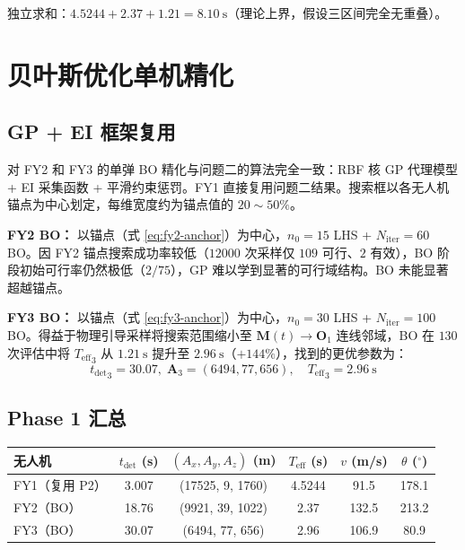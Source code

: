 \documentclass[12pt,a4paper]{ctexart}
\newcommand{\tdet}{t_{\text{det}}}
\newcommand{\Teff}{T_{\text{eff}}}
\begin{document}
独立求和：$4.5244 + 2.37 + 1.21 = 8.10\ \mathrm{s}$（理论上界，假设三区间完全无重叠）。

\section{贝叶斯优化单机精化}
\label{sec:p4-bo}

\subsection{GP + EI 框架复用}

对 FY2 和 FY3 的单弹 BO 精化与问题二的算法完全一致：RBF 核 GP 代理模型 + EI 采集函数 + 平滑约束惩罚。FY1 直接复用问题二结果。搜索框以各无人机锚点为中心划定，每维宽度约为锚点值的 $20 \sim 50\%$。

\textbf{FY2 BO：}
以锚点（式 \ref{eq:fy2-anchor}）为中心，$n_0=15$ LHS + $N_{\text{iter}}=60$ BO。因 FY2 锚点搜索成功率较低（$12000$ 次采样仅 $109$ 可行、$2$ 有效），BO 阶段初始可行率仍然极低（$2/75$），GP 难以学到显著的可行域结构。BO 未能显著超越锚点。

\textbf{FY3 BO：}
以锚点（式 \ref{eq:fy3-anchor}）为中心，$n_0=30$ LHS + $N_{\text{iter}}=100$ BO。得益于物理引导采样将搜索范围缩小至 $\mathbf{M}(t) \to \mathbf{O}_1$ 连线邻域，BO 在 $130$ 次评估中将 ${\Teff}_3$ 从 $1.21\ \mathrm{s}$ 提升至 $2.96\ \mathrm{s}$（$+144\%$），找到的更优参数为：
\begin{equation}
\boxed{{\tdet}_3 = 30.07,\; \mathbf{A}_3 = (6494, 77, 656), \quad {\Teff}_3 = 2.96\ \mathrm{s}}
\end{equation}

\subsection{Phase 1 汇总}

\begin{center}
\begin{tabular}{lccccc}
\toprule
\textbf{无人机} & $\tdet$ (s) & $(A_x, A_y, A_z)$ (m) & ${\Teff}$ (s) & $v$ (m/s) & $\theta$ ($^\circ$) \\
\midrule
FY1（复用 P2）& 3.007 & (17525, 9, 1760) & 4.5244 & 91.5 & 178.1 \\
FY2（BO）     & 18.76 & (9921, 39, 1022) & 2.37   & 132.5 & 213.2 \\
FY3（BO）     & 30.07 & (6494, 77, 656)  & 2.96   & 106.9 & 80.9 \\
\bottomrule
\end{tabular}
\end{center}
\end{document}
